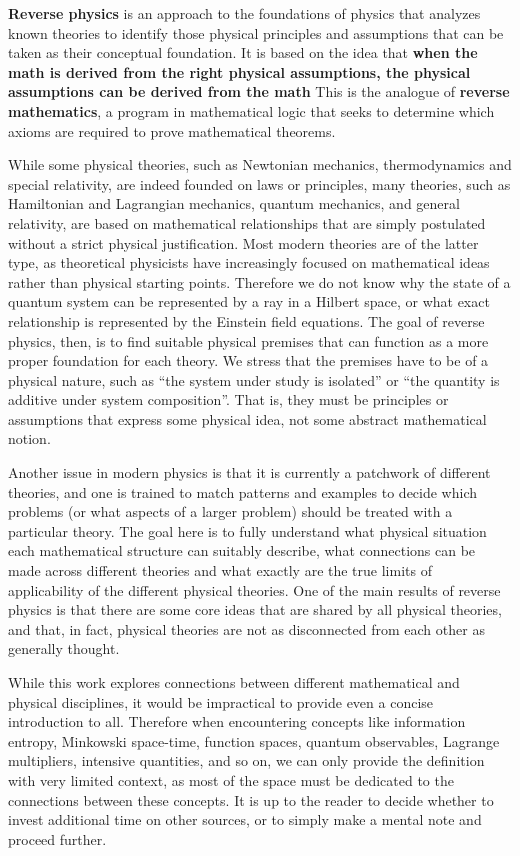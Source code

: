 \textbf{Reverse physics} is an approach to the foundations of physics that analyzes known theories to identify those physical principles and assumptions that can be taken as their conceptual foundation. It is based on the idea that \textbf{when the math is derived from the right physical assumptions, the physical assumptions can be derived from the math} This is the analogue of \textbf{reverse mathematics}, a program in mathematical logic that seeks to determine which axioms are required to prove mathematical theorems.

While some physical theories, such as Newtonian mechanics, thermodynamics and special relativity, are indeed founded on laws or principles, many theories, such as Hamiltonian and Lagrangian mechanics, quantum mechanics, and general relativity, are based on mathematical relationships that are simply postulated without a strict physical justification. Most modern theories are of the latter type, as theoretical physicists have increasingly focused on mathematical ideas rather than physical starting points. Therefore we do not know why the state of a quantum system can be represented by a ray in a Hilbert space, or what exact relationship is represented by the Einstein field equations. The goal of reverse physics, then, is to find suitable physical premises that can function as a more proper foundation for each theory. We stress that the premises have to be of a physical nature, such as ``the system under study is isolated'' or ``the quantity is additive under system composition''. That is, they must be principles or assumptions that express some physical idea, not some abstract mathematical notion.

Another issue in modern physics is that it is currently a patchwork of different theories, and one is trained to match patterns and examples to decide which problems (or what aspects of a larger problem) should be treated with a particular theory. The goal here is to fully understand what physical situation each mathematical structure can suitably describe, what connections can be made across different theories and what exactly are the true limits of applicability of the different physical theories. One of the main results of reverse physics is that there are some core ideas that are shared by all physical theories, and that, in fact, physical theories are not as disconnected from each other as generally thought.

While this work explores connections between different mathematical and physical disciplines, it would be impractical to provide even a concise introduction to all. Therefore when encountering concepts like information entropy, Minkowski space-time, function spaces, quantum observables, Lagrange multipliers, intensive quantities, and so on, we can only provide the definition with very limited context, as most of the space must be dedicated to the connections between these concepts. It is up to the reader to decide whether to invest additional time on other sources, or to simply make a mental note and proceed further.

